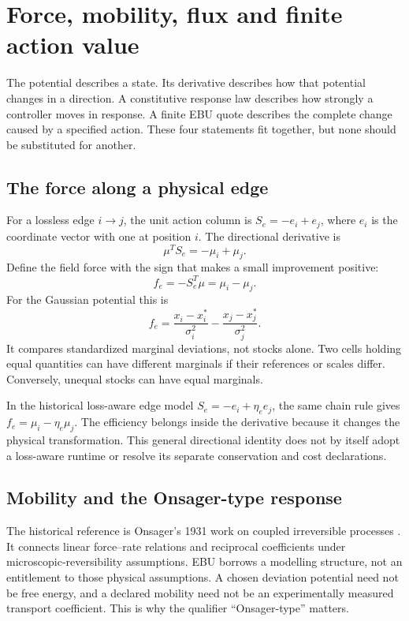 \chapter{Force, mobility, flux and finite action value}\label{ch:force}
The potential describes a state. Its derivative describes how that potential
changes in a direction. A constitutive response law describes how strongly
a controller moves in response. A finite EBU quote describes the complete
change caused by a specified action. These four statements fit together,
but none should be substituted for another.

\section{The force along a physical edge}
For a lossless edge $i\to j$, the unit action column is
$S_e=-e_i+e_j$, where $e_i$ is the coordinate vector with one at position
$i$. The directional derivative is
\begin{equation}
 \mu^T S_e=-\mu_i+\mu_j.
\end{equation}
Define the field force with the sign that makes a small improvement positive:
\begin{equation}\label{eq:force}
 f_e=-S_e^T\mu=\mu_i-\mu_j.
\end{equation}
For the Gaussian potential this is
\begin{equation}
 f_e=\frac{x_i-x_i^*}{\sigma_i^2}
       -\frac{x_j-x_j^*}{\sigma_j^2}.
\end{equation}
It compares standardized marginal deviations, not stocks alone. Two cells
holding equal quantities can have different marginals if their references
or scales differ. Conversely, unequal stocks can have equal marginals.

In the historical loss-aware edge model $S_e=-e_i+\eta_e e_j$, the same
chain rule gives $f_e=\mu_i-\eta_e\mu_j$. The efficiency belongs inside
the derivative because it changes the physical transformation. This general
directional identity does not by itself adopt a loss-aware runtime or
resolve its separate conservation and cost declarations.

\section{Mobility and the Onsager-type response}
The historical reference is Onsager's 1931 work on coupled irreversible
processes \cite{onsager-one,onsager-two}. It connects linear force--rate
relations and reciprocal coefficients under microscopic-reversibility
assumptions. EBU borrows a modelling structure, not an entitlement to those
physical assumptions. A chosen deviation potential need not be free energy,
and a declared mobility need not be an experimentally measured transport
coefficient. This is why the qualifier ``Onsager-type'' matters.

